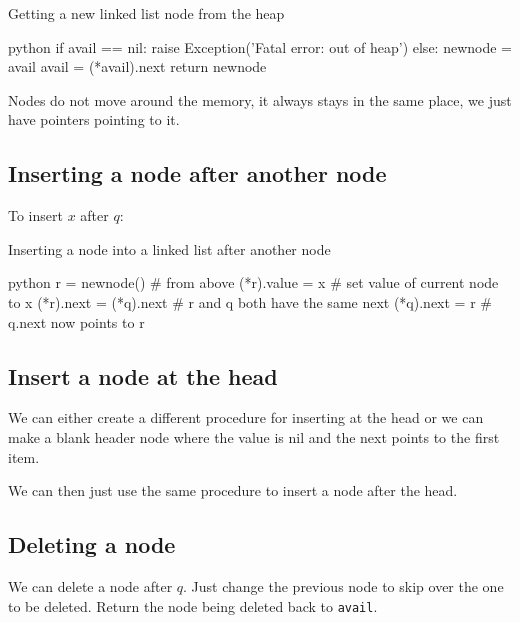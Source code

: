 \begin{highlight}{Getting a new linked list node from the heap}
    \begin{code}{python}
        if avail == nil:
        raise Exception('Fatal error: out of heap')
        else:
        newnode = avail
        avail = (*avail).next
        return newnode
    \end{code}
\end{highlight}

\begin{note}
    Nodes do not move around the memory, it always stays in the same place, we just have pointers pointing to it.
\end{note}

\subsection{Inserting a node after another node}\label{sub:inserting_a_node_after_another_node}

To insert \(x\) after \(q\):
\begin{highlight}{Inserting a node into a linked list after another node}
    \begin{code}{python}
        r = newnode() # from above
        (*r).value = x # set value of current node to x
        (*r).next = (*q).next # r and q both have the same next
        (*q).next = r # q.next now points to r
    \end{code}
\end{highlight}

\subsection{Insert a node at the head}\label{sub:insert_a_node_at_the_head}

We can either create a different procedure for inserting at the head or we can make a blank header node where the value is nil and the next points to the first item.

We can then just use the same procedure to insert a node after the head.

\subsection{Deleting a node}\label{sub:deleting_a_node}

We can delete a node after \(q\).
Just change the previous node to skip over the one to be deleted.
Return the node being deleted back to \texttt{avail}.

